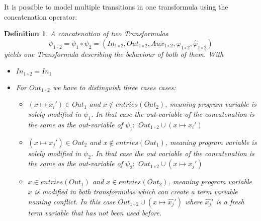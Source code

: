 \documentclass{article}
\newcommand{\invars}{\ensuremath{In}\xspace}
\newcommand{\outvars}{\ensuremath{Out}\xspace}
\newcommand{\auxvars}{\ensuremath{Aux}\xspace}
\newtheorem{mydef}{Definition}
\begin{document}
It is possible to model multiple transitions in one transformula using the concatenation operator:
\begin{mydef}
	A concatenation of two Transformulas 
	\begin{equation*}
		\psi_{1 \circ 2} = \psi_1 \circ \psi_2 = (\invars_{1 \circ 2}, \outvars_{1 \circ 2}, \auxvars_{1 \circ 2}, \varphi_{1 \circ 2}, \widehat{\varphi}_{1 \circ 2})
	\end{equation*}  yields one Transformula describing the behaviour of both of them. With
	\begin{itemize}
		\item $\invars_{1 \circ 2} = \invars_1$
		\item For $\outvars_{1 \circ 2}$ we have to distinguish three cases cases: 
		\begin{itemize}
			
			\item[I:] $(x \mapsto x_i') \in Out_1$ and $x  \not\in entries(Out_2)$, meaning program variable is solely modified in $\psi_1$. In that case the out-variable of the concatenation is the same as the out-variable of $\psi_1: $ $\outvars_{1 \circ 2} \cup (x \mapsto x_i')$ 
			\item[II:] $(x \mapsto x_j') \in Out_2$ and $x  \not\in entries(Out_1)$, meaning program variable is solely modified in $\psi_2$. In that case the out variable of the concatenation is the same as the out-variable of $\psi_2: $ $\outvars_{1 \circ 2} \cup (x \mapsto x_j')$ 
			\item[III:] $x \in entries(Out_1)$ and $x \in entries(Out_2)$, meaning program variable $x$ is modified in both transformulas which can create a term variable naming conflict. 
			In this case $\outvars_{1 \circ 2} \cup (x \mapsto \widehat{x_j}')$ where $\widehat{x_j}'$ is a fresh term variable that has not been used before.
			
		\end{itemize}
		

\end{itemize}
\end{mydef}
\end{document}
